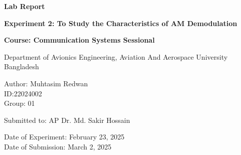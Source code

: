 \begin{titlepage}
    \centering
    
    \Huge
    \textbf{Lab Report}
    
    \vspace{0.5in}
    \LARGE
    \textbf{Experiment 2: To Study the Characteristics of AM Demodulation}
    
    \vspace{1in}
    
    \textbf{Course: Communication Systems Sessional}

    \vspace{1in}
    
    Department of Avionics Engineering, Aviation And Aerospace University Bangladesh\\
    
    \vspace{0.5in}
    
    Author: Muhtasim Redwan \\
    ID:22024002\\
    Group: 01\\
    
    \vspace{0.5in}
    
    Submitted to: AP Dr. Md. Sakir Hossain \\
    
    \vfill
    
    \Large
    Date of Experiment: February 23, 2025\\
    Date of Submission: March 2, 2025\\
    
\end{titlepage}